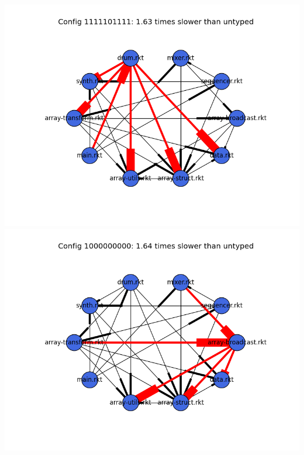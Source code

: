 \documentclass{article}
\begin{document}
\begin{itemize}
\includegraphics[width=\textwidth]{funkytown-module-graph-1111101111.png}
\includegraphics[width=\textwidth]{funkytown-module-graph-1000000000.png}
\end{itemize}
\end{document}

